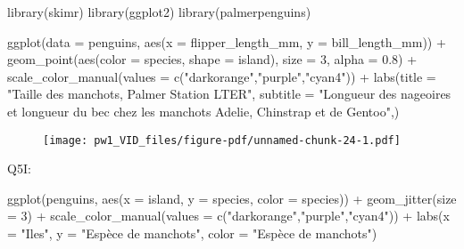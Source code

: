 \documentclass[
  letterpaper,
  DIV=11,
  numbers=noendperiod]{scrartcl}
\newenvironment{Shaded}{}{}
\newcommand{\AttributeTok}[1]{\textcolor[rgb]{0.84,0.23,0.29}{#1}}
\newcommand{\DecValTok}[1]{\textcolor[rgb]{0.00,0.36,0.77}{#1}}
\newcommand{\FloatTok}[1]{\textcolor[rgb]{0.00,0.36,0.77}{#1}}
\newcommand{\FunctionTok}[1]{\textcolor[rgb]{0.44,0.26,0.76}{#1}}
\newcommand{\NormalTok}[1]{\textcolor[rgb]{0.14,0.16,0.18}{#1}}
\newcommand{\SpecialCharTok}[1]{\textcolor[rgb]{0.00,0.36,0.77}{#1}}
\newcommand{\StringTok}[1]{\textcolor[rgb]{0.01,0.18,0.38}{#1}}
\begin{document}
\begin{Shaded}
\begin{Highlighting}[]
\FunctionTok{library}\NormalTok{(skimr)}
\FunctionTok{library}\NormalTok{(ggplot2)}
\FunctionTok{library}\NormalTok{(palmerpenguins)}

\FunctionTok{ggplot}\NormalTok{(}\AttributeTok{data =}\NormalTok{ penguins, }\FunctionTok{aes}\NormalTok{(}\AttributeTok{x =}\NormalTok{ flipper\_length\_mm, }\AttributeTok{y =}\NormalTok{ bill\_length\_mm)) }\SpecialCharTok{+}
  \FunctionTok{geom\_point}\NormalTok{(}\FunctionTok{aes}\NormalTok{(}\AttributeTok{color =}\NormalTok{ species, }\AttributeTok{shape =}\NormalTok{ island), }\AttributeTok{size =} \DecValTok{3}\NormalTok{, }\AttributeTok{alpha =} \FloatTok{0.8}\NormalTok{) }\SpecialCharTok{+}
  \FunctionTok{scale\_color\_manual}\NormalTok{(}\AttributeTok{values =} \FunctionTok{c}\NormalTok{(}\StringTok{"darkorange"}\NormalTok{,}\StringTok{"purple"}\NormalTok{,}\StringTok{"cyan4"}\NormalTok{)) }\SpecialCharTok{+}
  \FunctionTok{labs}\NormalTok{(}\AttributeTok{title =} \StringTok{"Taille des manchots, Palmer Station LTER"}\NormalTok{,}
  \AttributeTok{subtitle =} \StringTok{"Longueur des nageoires et longueur du bec chez les manchots Adelie,    Chinstrap et de Gentoo"}\NormalTok{,)}
\end{Highlighting}
\end{Shaded}

\begin{figure}[H]

{\centering \texttt{[image: pw1\_VID\_files/figure-pdf/unnamed-chunk-24-1.pdf]}

}

\end{figure}

Q5I:

\begin{Shaded}
\begin{Highlighting}[]
\FunctionTok{ggplot}\NormalTok{(penguins, }\FunctionTok{aes}\NormalTok{(}\AttributeTok{x =}\NormalTok{ island, }\AttributeTok{y =}\NormalTok{ species, }\AttributeTok{color =}\NormalTok{ species)) }\SpecialCharTok{+}
  \FunctionTok{geom\_jitter}\NormalTok{(}\AttributeTok{size =} \DecValTok{3}\NormalTok{) }\SpecialCharTok{+} 
  \FunctionTok{scale\_color\_manual}\NormalTok{(}\AttributeTok{values =} \FunctionTok{c}\NormalTok{(}\StringTok{"darkorange"}\NormalTok{,}\StringTok{"purple"}\NormalTok{,}\StringTok{"cyan4"}\NormalTok{)) }\SpecialCharTok{+}
  \FunctionTok{labs}\NormalTok{(}\AttributeTok{x =} \StringTok{"Iles"}\NormalTok{,}
       \AttributeTok{y =} \StringTok{"Espèce de manchots"}\NormalTok{,}
       \AttributeTok{color =} \StringTok{"Espèce de manchots"}\NormalTok{)}
\end{Highlighting}
\end{Shaded}
\end{document}
